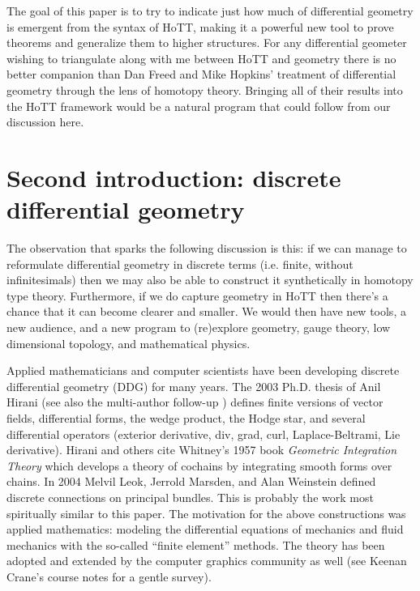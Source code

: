 The goal of this paper is to try to indicate just how much of
differential geometry is emergent from the syntax of HoTT, making it a
powerful new tool to prove theorems and generalize them to higher
structures. For any differential geometer wishing to triangulate along
with me between HoTT and geometry there is no better companion than Dan
Freed and Mike Hopkins' treatment of differential geometry through the
lens of homotopy theory\cite{freed2013chernweil}. Bringing all of their
results into the HoTT framework would be a natural program that could
follow from our discussion here.

\section{Second introduction: discrete differential
geometry}\label{second-introduction-discrete-differential-geometry}

The observation that sparks the following discussion is this: if we can
manage to reformulate differential geometry in discrete terms (i.e.
finite, without infinitesimals) then we may also be able to construct it
synthetically in homotopy type theory. Furthermore, if we do capture
geometry in HoTT then there's a chance that it can become clearer and
smaller. We would then have new tools, a new audience, and a new program
to (re)explore geometry, gauge theory, low dimensional topology, and
mathematical physics.

Applied mathematicians and computer scientists have been developing
discrete differential geometry (DDG) for many years. The 2003 Ph.D.
thesis of Anil Hirani \cite{hiranidec} (see also the multi-author
follow-up \cite{desbrundec}) defines finite versions of vector fields,
differential forms, the wedge product, the Hodge star, and several
differential operators (exterior derivative, div, grad, curl,
Laplace-Beltrami, Lie derivative). Hirani and others cite Whitney's 1957
book \emph{Geometric Integration Theory}\cite{whitney1957} which
develops a theory of cochains by integrating smooth forms over chains.
In 2004 Melvil Leok, Jerrold Marsden, and Alan Weinstein \cite{leok}
defined discrete connections on principal bundles. This is probably the
work most spiritually similar to this paper. The motivation for the
above constructions was applied mathematics: modeling the differential
equations of mechanics and fluid mechanics with the so-called ``finite
element'' methods. The theory has been adopted and extended by the
computer graphics community as well (see Keenan Crane's course notes
\cite{crane_ddg} for a gentle survey).

